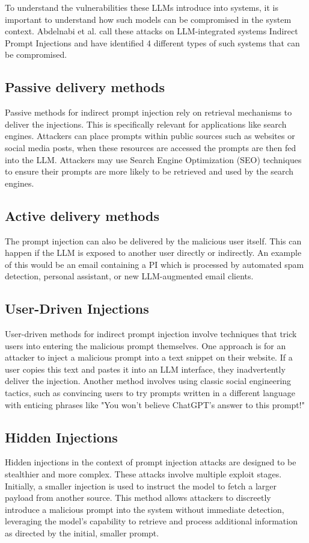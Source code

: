 \documentclass{SeminarV2}
\begin{document}
To understand the vulnerabilities these LLMs introduce into systems, it is important to understand how such models can be compromised in the system context. Abdelnabi et al. \cite{abdelnabi2023not} call these attacks on LLM-integrated systems Indirect Prompt Injections and have identified 4 different types of such systems that can be compromised.

\subsection{Passive delivery methods}
Passive methods for indirect prompt injection rely on retrieval mechanisms to deliver the injections. This is specifically relevant for applications like search engines. Attackers can place prompts within public sources such as websites or social media posts, when these resources are accessed the prompts are then fed into the LLM. Attackers may use Search Engine Optimization (SEO) techniques to ensure their prompts are more likely to be retrieved and used by the search engines.
\subsection{Active delivery methods}
The prompt injection can also be delivered by the malicious user itself. This can happen if the LLM is exposed to another user directly or indirectly. An example of this would be an email containing a PI which is processed by automated spam detection, personal assistant, or new LLM-augmented email clients.

\subsection{User-Driven Injections}
User-driven methods for indirect prompt injection involve techniques that trick users into entering the malicious prompt themselves. One approach is for an attacker to inject a malicious prompt into a text snippet on their website. If a user copies this text and pastes it into an LLM interface, they inadvertently deliver the injection. Another method involves using classic social engineering tactics, such as convincing users to try prompts written in a different language with enticing phrases like "You won't believe ChatGPT's answer to this prompt!" 
\subsection{Hidden Injections}
Hidden injections in the context of prompt injection attacks are designed to be stealthier and more complex. These attacks involve multiple exploit stages. Initially, a smaller injection is used to instruct the model to fetch a larger payload from another source. This method allows attackers to discreetly introduce a malicious prompt into the system without immediate detection, leveraging the model's capability to retrieve and process additional information as directed by the initial, smaller prompt.
\end{document}
